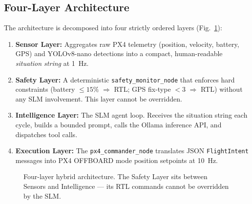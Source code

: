 \documentclass[conference]{IEEEtran}
\begin{document}
\subsection{Four-Layer Architecture}

The architecture is decomposed into four strictly ordered layers (Fig.~\ref{fig:layers}):

\begin{enumerate}
    \item \textbf{Sensor Layer:} Aggregates raw PX4 telemetry (position, velocity, battery, GPS) and YOLOv8-nano detections into a compact, human-readable \emph{situation string} at 1~Hz.
    \item \textbf{Safety Layer:} A deterministic \texttt{safety\_monitor\_node} that enforces hard constraints (battery $\leq 15\%$ $\Rightarrow$ RTL; GPS fix-type $< 3$ $\Rightarrow$ RTL) without any SLM involvement. This layer cannot be overridden.
    \item \textbf{Intelligence Layer:} The SLM agent loop. Receives the situation string each cycle, builds a bounded prompt, calls the Ollama inference API, and dispatches tool calls.
    \item \textbf{Execution Layer:} The \texttt{px4\_commander\_node} translates JSON \texttt{FlightIntent} messages into PX4 OFFBOARD mode position setpoints at 10~Hz.
\end{enumerate}

\begin{figure}[htbp]
\centering
{}
\caption{Four-layer hybrid architecture. The Safety Layer sits between Sensors and Intelligence — its RTL commands cannot be overridden by the SLM.}
\label{fig:layers}
\end{figure}
\end{document}
